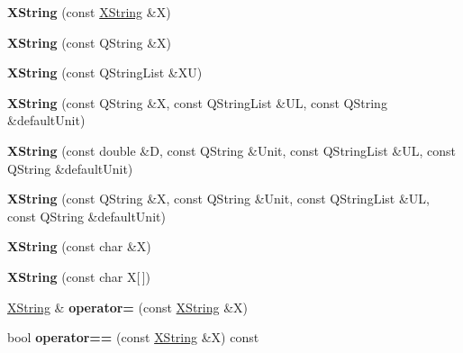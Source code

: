 \begin{DoxyCompactItemize}
\item 
\mbox{\label{class_x_string_aca35a3fb074cbd83d4f9cf3f894ac9a4}} 
{\bfseries X\+String} (const \hyperlink{class_x_string}{X\+String} \&X)
\item 
\mbox{\label{class_x_string_a9219dd6e415d321749ba2f6a386f0b84}} 
{\bfseries X\+String} (const Q\+String \&X)
\item 
\mbox{\label{class_x_string_a2d9c4b3a168e6d5e3e8c24fdeaed8867}} 
{\bfseries X\+String} (const Q\+String\+List \&XU)
\item 
\mbox{\label{class_x_string_a9556899f8bd99ed5cb9eac3bba48e841}} 
{\bfseries X\+String} (const Q\+String \&X, const Q\+String\+List \&UL, const Q\+String \&default\+Unit)
\item 
\mbox{\label{class_x_string_a74386ce20355482c54a362b8f236fb27}} 
{\bfseries X\+String} (const double \&D, const Q\+String \&Unit, const Q\+String\+List \&UL, const Q\+String \&default\+Unit)
\item 
\mbox{\label{class_x_string_a91c8430f029b058dbd958817c167a087}} 
{\bfseries X\+String} (const Q\+String \&X, const Q\+String \&Unit, const Q\+String\+List \&UL, const Q\+String \&default\+Unit)
\item 
\mbox{\label{class_x_string_a1cc28d3af845a5b854025b437cde372f}} 
{\bfseries X\+String} (const char \&X)
\item 
\mbox{\label{class_x_string_ac8623357d7b4f4002da232f5c74934e3}} 
{\bfseries X\+String} (const char X\mbox{[}$\,$\mbox{]})
\item 
\mbox{\label{class_x_string_a9216d6002b60af8ae601e6629394acd5}} 
\hyperlink{class_x_string}{X\+String} \& {\bfseries operator=} (const \hyperlink{class_x_string}{X\+String} \&X)
\item 
\mbox{\label{class_x_string_a2799a4d0d860ad65a44bb1486991ac32}} 
bool {\bfseries operator==} (const \hyperlink{class_x_string}{X\+String} \&X) const

\end{DoxyCompactItemize}
